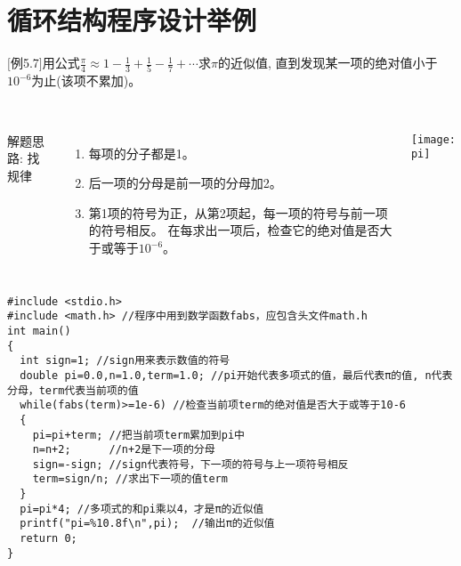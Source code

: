 
\section{循环结构程序设计举例}

\begin{frame}
$[$例5.7$]$用公式$\frac{\pi}{4}\approx 1-\frac{1}{3}+\frac{1}{5}-\frac{1}{7}+\cdots$求$\pi$的近似值, 直到发现某一项的绝对值小于$10^{-6}$为止(该项不累加)。\\
~\\
\begin{columns}
解题思路:  找规律
\begin{enumerate}
	\item 每项的分子都是1。
	\item 后一项的分母是前一项的分母加2。
	\item 第1项的符号为正，从第2项起，每一项的符号与前一项的符号相反。
	在每求出一项后，检查它的绝对值是否大于或等于$10^{-6}$。
\end{enumerate}
\texttt{[image: pi]}
\end{columns}
\end{frame}

\begin{frame}
\begin{lstlisting}
#include <stdio.h>
#include <math.h> //程序中用到数学函数fabs，应包含头文件math.h
int main()
{
  int sign=1; //sign用来表示数值的符号
  double pi=0.0,n=1.0,term=1.0; //pi开始代表多项式的值，最后代表π的值, n代表分母，term代表当前项的值
  while(fabs(term)>=1e-6) //检查当前项term的绝对值是否大于或等于10-6
  {
    pi=pi+term; //把当前项term累加到pi中
    n=n+2;      //n+2是下一项的分母 
    sign=-sign; //sign代表符号，下一项的符号与上一项符号相反
    term=sign/n; //求出下一项的值term
  }
  pi=pi*4; //多项式的和pi乘以4，才是π的近似值
  printf("pi=%10.8f\n",pi);  //输出π的近似值  
  return 0;
}
\end{lstlisting}
\end{frame}

